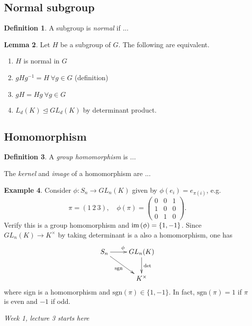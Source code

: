 \documentclass[a4paper]{article}
\newcommand{\sgn}{\text{sgn}}
\newcommand{\im}{\text{im\,}}
\theoremstyle{definition}
\newtheorem{defn}{Definition}[subsection]
\newtheorem{lemma}[defn]{Lemma}
\newtheorem{example}[defn]{Example}
\begin{document}
\subsection{Normal subgroup}

\begin{defn}
A subgroup is \textit{normal} if ...
\end{defn}
\begin{lemma}
Let $H$ be a subgroup of $G$. The following are equivalent.
\begin{enumerate}
\item $H$ is normal in $G$
\item $gHg^{-1}=H \ \forall g\in G$ \qquad (definition)
\item $gH=Hg \ \forall g\in G$
\item $L_d(K)\unlhd GL_d(K)$ by determinant product.
\end{enumerate}
\end{lemma}

\subsection{Homomorphism}

\begin{defn}
A \textit{group homomorphism} is ...

The \textit{kernel} and \textit{image} of a homomorphism are ...
\end{defn}

\begin{example}
\label{example:1stexofrep}
Consider $\phi:S_n\rightarrow GL_n(K)$ given by $\phi(e_i)=e_{\pi(i)}$, e.g.
\[
\pi=(1\ 2\ 3),\quad \phi(\pi)=\begin{pmatrix}
  0 & 0 & 1 \\ 1 & 0 & 0 \\ 0 & 1 & 0
\end{pmatrix}.
\]
Verify this is a group homomorphism and $\im(\phi)=\{1,-1\}$. Since $GL_n(K)\rightarrow K^\times$ by taking determinant is a also a homomorphism, one has
\[
\xymatrix{
    S_n\ar[r]^\phi \ar[dr]_{\sgn} & GL_n(K)\ar[d]^\det  \\ & K^\times
}
\]
where sign is a homomorphism and $\sgn(\pi)\in\{1,-1\}$. In fact, $\sgn(\pi)=1$ if $\pi$ is even and $-1$ if odd.
\end{example}

\begin{flushright}
\textit{Week 1, lecture 3 starts here}
\end{flushright}
\end{document}
